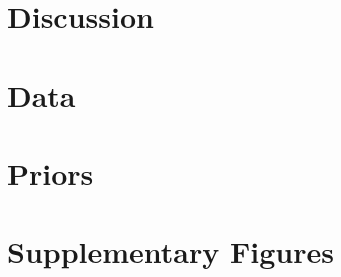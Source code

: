 \documentclass[a4paper, oneside]{discothesis}
\begin{document}



\chapter{Discussion}





\appendix
\chapter{Data}
\chapter{Priors}
\chapter{Supplementary Figures}
\end{document}
